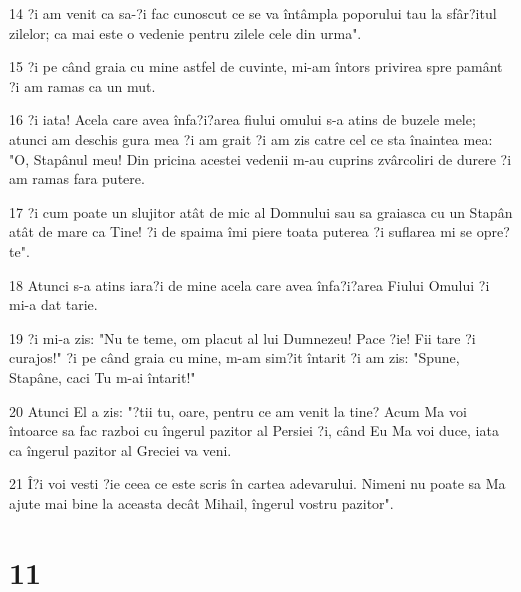 \par 14 ?i am venit ca sa-?i fac cunoscut ce se va întâmpla poporului tau la sfâr?itul zilelor; ca mai este o vedenie pentru zilele cele din urma".
\par 15 ?i pe când graia cu mine astfel de cuvinte, mi-am întors privirea spre pamânt ?i am ramas ca un mut.
\par 16 ?i iata! Acela care avea înfa?i?area fiului omului s-a atins de buzele mele; atunci am deschis gura mea ?i am grait ?i am zis catre cel ce sta înaintea mea: "O, Stapânul meu! Din pricina acestei vedenii m-au cuprins zvârcoliri de durere ?i am ramas fara putere.
\par 17 ?i cum poate un slujitor atât de mic al Domnului sau sa graiasca cu un Stapân atât de mare ca Tine! ?i de spaima îmi piere toata puterea ?i suflarea mi se opre?te".
\par 18 Atunci s-a atins iara?i de mine acela care avea înfa?i?area Fiului Omului ?i mi-a dat tarie.
\par 19 ?i mi-a zis: "Nu te teme, om placut al lui Dumnezeu! Pace ?ie! Fii tare ?i curajos!" ?i pe când graia cu mine, m-am sim?it întarit ?i am zis: "Spune, Stapâne, caci Tu m-ai întarit!"
\par 20 Atunci El a zis: "?tii tu, oare, pentru ce am venit la tine? Acum Ma voi întoarce sa fac razboi cu îngerul pazitor al Persiei ?i, când Eu Ma voi duce, iata ca îngerul pazitor al Greciei va veni.
\par 21 Î?i voi vesti ?ie ceea ce este scris în cartea adevarului. Nimeni nu poate sa Ma ajute mai bine la aceasta decât Mihail, îngerul vostru pazitor".

\chapter{11}

